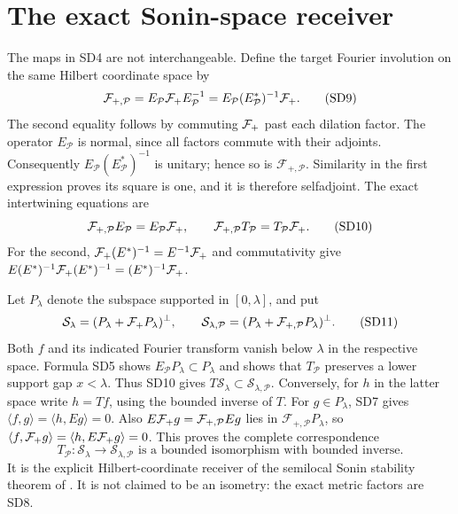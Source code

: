 \documentclass[11pt]{article}
\begin{document}
\section{The exact Sonin-space receiver}
The maps in SD4 are not interchangeable. Define the target Fourier
involution on the same Hilbert coordinate space by
\[
 \mathcal F_{+,\mathcal P}=E_{\mathcal P}\mathcal F_+ E_{\mathcal P}^{-1}
   =E_{\mathcal P}(E_{\mathcal P}^*)^{-1}\mathcal F_+.                    \tag{SD9}
\]
The second equality follows by commuting $\mathcal F_+$ past each dilation
factor. The operator $E_{\mathcal P}$ is normal, since all factors
commute with their adjoints. Consequently
$E_{\mathcal P}(E_{\mathcal P}^*)^{-1}$ is unitary; hence so is
$\mathcal F_{+,\mathcal P}$. Similarity in the first expression proves its
square is one, and it is therefore selfadjoint. The exact
intertwining equations are
\[
 \mathcal F_{+,\mathcal P}E_{\mathcal P}=E_{\mathcal P}\mathcal F_+,
 \qquad\mathcal F_{+,\mathcal P}T_{\mathcal P}=T_{\mathcal P}\mathcal F_+.
                                                               \tag{SD10}
\]
For the second, $\mathcal F_+(E^*)^{-1}=E^{-1}\mathcal F_+$ and commutativity give
$E(E^*)^{-1}\mathcal F_+(E^*)^{-1}=(E^*)^{-1}\mathcal F_+$.

Let $P_\lambda$ denote the subspace supported in $[0,\lambda]$,
and put
\[
 \mathcal S_\lambda=(P_\lambda+\mathcal F_+ P_\lambda)^\perp,
 \qquad
 \mathcal S_{\lambda,\mathcal P}
      =(P_\lambda+\mathcal F_{+,\mathcal P}P_\lambda)^\perp.              \tag{SD11}
\]
Both $f$ and its indicated Fourier transform vanish below $\lambda$
in the respective space. Formula SD5 shows
$E_{\mathcal P}P_\lambda\subset P_\lambda$ and shows that
$T_{\mathcal P}$ preserves a lower support gap $x<\lambda$.
Thus SD10 gives $T\mathcal S_\lambda\subset
\mathcal S_{\lambda,\mathcal P}$.
Conversely, for $h$ in the latter space write $h=Tf$, using the
bounded inverse of $T$. For $g\in P_\lambda$, SD7 gives
$\langle f,g\rangle=\langle h,Eg\rangle=0$.
Also $E\mathcal F_+ g=\mathcal F_{+,\mathcal P}Eg$ lies in
$\mathcal F_{+,\mathcal P}P_\lambda$, so
$\langle f,\mathcal F_+ g\rangle=\langle h,E\mathcal F_+ g\rangle=0$.
This proves the complete correspondence
\[
 \boxed{T_{\mathcal P}:\mathcal S_\lambda
       \longrightarrow\mathcal S_{\lambda,\mathcal P}
       \text{ is a bounded isomorphism with bounded inverse}.}  \tag{SD12}
\]
It is the explicit Hilbert-coordinate receiver of the semilocal
Sonin stability theorem of \cite{swdual:CCM}. It is not claimed to be an
isometry: the exact metric factors are SD8.
\end{document}
